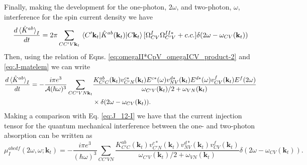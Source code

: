 \documentclass{article}
\newcommand{\kt}{\mathbf{k}_{t}}
\begin{document}
Finally, making the development for the one-photon, $2\omega$, and two-photon,
$\omega$, interference for the spin current density we have
\begin{equation*}
\frac{d\ev*{\hat{K}^{ab}}_{I}}{dt} = 2 \pi \sum_{CC'V\kt} \mel{C'\kt}
{\hat{K}^{ab}(\kt)}{C\kt} [\Omega^{I}_{CV} \Omega^{II*}_{C'V} + c.c.]
\delta(2\omega - \omega_{CV}(\kt))
\end{equation*}
Then, using the relation of Eqns. \eqref{eq:omegaII*CpV_omegaICV_product-2}
and \eqref{eq:J-matelem} we can write
\begin{equation*}
\begin{split}
\frac{d\ev*{\hat{K}^{ab}}_{I}}{dt} = - \frac{i \pi e^{3}}{\mathcal{A}(\hbar 
\omega)^{3}}\sum_{CC'VN\kt} & \frac{K^{ab}_{C'C}(\kt) v^{c*}_{C'N}(\kt) 
E^{c*}(\omega) v^{d*}_{NV}(\kt) E^{d*}(\omega) v^{f}_{CV}(\kt) E^{f}(2\omega) }
{\omega_{C'V}(\kt)/2 + \omega_{VN}(\kt)} \\
& \times \delta(2\omega - \omega_{CV}(\kt)) .
\end{split}
\end{equation*}
Making a comparison with Eq. \eqref{eq:J_12-I} we have that the current
injection tensor for the quantum mechanical interference between the one- and
two-photon absorption can be written as
\begin{equation}
\mu^{abcdf}_{I}(2\omega,\omega;\kt) = - \frac{i \pi e^{3}}{(\hbar 
\omega)^{3}}\sum_{CC'VN} \frac{K^{ab}_{C'C}(\kt) v^{c*}_{C'N}(\kt) 
v^{d*}_{NV}(\kt) v^{f}_{CV}(\kt) }{\omega_{C'V}(\kt)/2 + \omega_{VN}(\kt)} 
\delta(2\omega - \omega_{CV}(\kt)) .
\end{equation}
\end{document}
